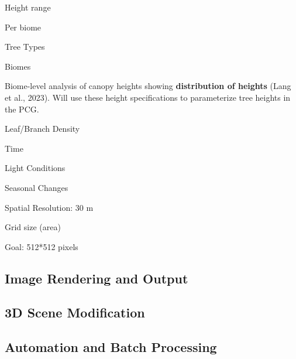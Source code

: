 \documentclass[12pt, man, dvipsnames, floatsintext]{apa7}
\begin{document}
\begin{APAitemize}
\item
  Height range
\item
  Per biome
\item
  Tree Types
\item
  Biomes

  \begin{APAitemize}
  \item
    Biome-level analysis of canopy heights showing \textbf{distribution
    of heights} (Lang et al., 2023). Will use these height
    specifications to parameterize tree heights in the PCG.
  \end{APAitemize}
\item
  Leaf/Branch Density
\item
  Time
\item
  Light Conditions
\item
  Seasonal Changes
\item
  Spatial Resolution: 30 m

  \begin{APAitemize}
  
  \item
    Grid size (area)
  \item
    Goal: 512*512 pixels
  \end{APAitemize}
\end{APAitemize}

\hypertarget{image-rendering-and-output}{%
\subsection{Image Rendering and
Output}\label{image-rendering-and-output}}

\hypertarget{d-scene-modification}{%
\subsection{3D Scene Modification}\label{d-scene-modification}}

\hypertarget{automation-and-batch-processing}{%
\subsection{Automation and Batch
Processing}\label{automation-and-batch-processing}}


\printbibliography
\end{document}
